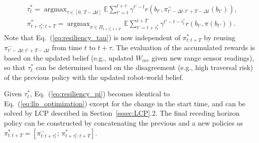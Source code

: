 \documentclass[letterpaper]{article} %
\newcommand{\argmax}{\mathop{\mathrm{argmax}}}
\begin{document}
\begin{align}
  & \tau^*_t = \argmax_{\tau \in [0,\, T-\Delta t]} \mathbb{E} \sum_{t'=t}^{t+\tau} \gamma^{t'-t} r(b_{t'}, \pi_{{t'}-\Delta t:{t'}+T-\Delta t}^-(b_{t'})),
  \label{eq:resiliency_tau}
  \\
  & \pi_{t+\tau^*_t:t+T}^* = \argmax_{\pi \in \Pi_{t+\tau^*_t:t+T}} \, \mathbb{E} \sum_{t'=t+\tau^*_t}^{t+T} \gamma^{t'-t-\tau^*_t} r(b_{t'}, \pi(b_{t'})).
  \label{eq:resiliency_pi}
\end{align}
\normalsize
%
Note that Eq.~(\ref{eq:resiliency_tau}) is now independent of $\pi_{t:t+T}^*$ by reusing $\pi_{{t'}-\Delta t:{t'}+T-\Delta t}^-$ from time $t$ to $t + \tau$.
The evaluation of the accumulated rewards is based on the updated belief (e.g., updated $W_{occ}$ given new range sensor readings), so that $\tau^*_t$ can be determined based on the disagreement (e.g., high traversal risk) of the previous policy with the updated robot-world belief.

Given $\tau^*_t$, Eq.~(\ref{eq:resiliency_pi}) becomes identical to Eq.~(\ref{eq:llp_optimization}) except for the change in the start time,
and can be solved by LCP described in Section~\ref{sssec:LCP}.2.  %
%
The final receding horizon policy can be constructed by concatenating the previous and a new policies as $\pi_{t:t+T}^* = [\pi_{t:t+\tau^*_t}^-; \, \pi_{t+\tau^*_t:t+T}^*]$.




\end{document}
